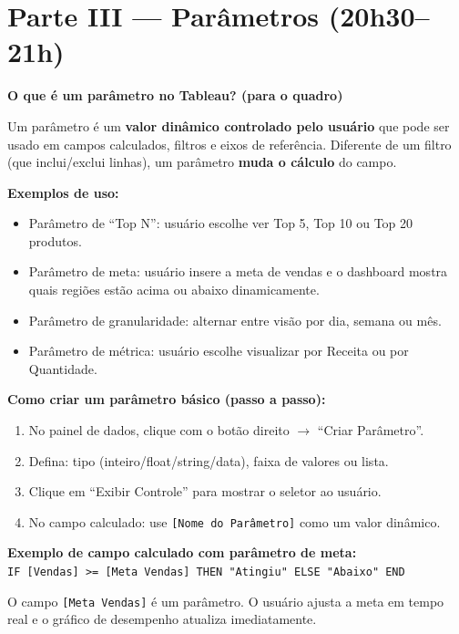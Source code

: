 \section{Parte III — Parâmetros (20h30–21h)}

\begin{BoardBox}
\textbf{O que é um parâmetro no Tableau? (para o quadro)}

Um parâmetro é um \textbf{valor dinâmico controlado pelo usuário} que pode ser
usado em campos calculados, filtros e eixos de referência. Diferente de um filtro
(que inclui/exclui linhas), um parâmetro \textbf{muda o cálculo} do campo.

\textbf{Exemplos de uso:}
\begin{itemize}
  \item Parâmetro de ``Top N'': usuário escolhe ver Top 5, Top 10 ou Top 20 produtos.
  \item Parâmetro de meta: usuário insere a meta de vendas e o dashboard mostra quais
  regiões estão acima ou abaixo dinamicamente.
  \item Parâmetro de granularidade: alternar entre visão por dia, semana ou mês.
  \item Parâmetro de métrica: usuário escolhe visualizar por Receita ou por Quantidade.
\end{itemize}
\end{BoardBox}

\begin{SolvedBox}
\textbf{Como criar um parâmetro básico (passo a passo):}

\begin{enumerate}
  \item No painel de dados, clique com o botão direito $\to$ ``Criar Parâmetro''.
  \item Defina: tipo (inteiro/float/string/data), faixa de valores ou lista.
  \item Clique em ``Exibir Controle'' para mostrar o seletor ao usuário.
  \item No campo calculado: use \texttt{[Nome do Parâmetro]} como um valor dinâmico.
\end{enumerate}

\textbf{Exemplo de campo calculado com parâmetro de meta:}\\
\texttt{IF [Vendas] >= [Meta Vendas] THEN "Atingiu" ELSE "Abaixo" END}

O campo \texttt{[Meta Vendas]} é um parâmetro. O usuário ajusta a meta em
tempo real e o gráfico de desempenho atualiza imediatamente.
\end{SolvedBox}

